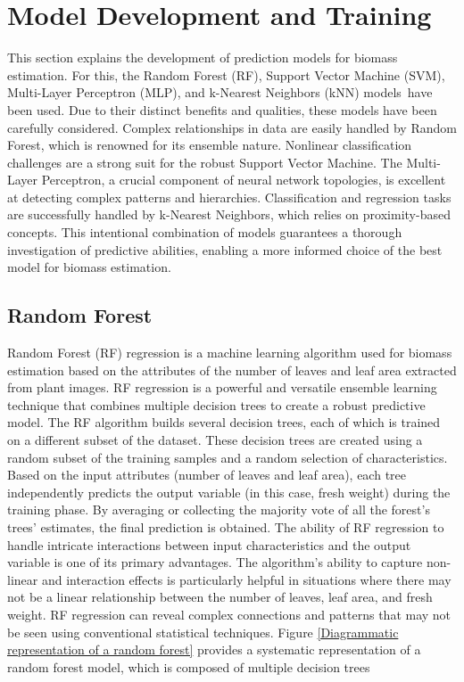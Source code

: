 \documentclass[a4paper,12pt]{report}%
\renewcommand{\\}{\vspace*{0.5\baselineskip} \newline}
\begin{document}
\section{Model Development and Training}
This section explains the development of prediction models for biomass estimation. For this, the Random Forest (RF), Support Vector Machine (SVM), Multi-Layer Perceptron (MLP), and k-Nearest Neighbors (kNN) models have been used. Due to their distinct benefits and qualities, these models have been carefully considered. Complex relationships in data are easily handled by Random Forest, which is renowned for its ensemble nature. Nonlinear classification challenges are a strong suit for the robust Support Vector Machine. The Multi-Layer Perceptron, a crucial component of neural network topologies, is excellent at detecting complex patterns and hierarchies. Classification and regression tasks are successfully handled by k-Nearest Neighbors, which relies on proximity-based concepts.
This intentional combination of models guarantees a thorough investigation of predictive abilities, enabling a more informed choice of the best model for biomass estimation.


\subsection{Random Forest}
Random Forest (RF) regression is a machine learning algorithm used for biomass estimation based on the attributes of the number of leaves and leaf area extracted from plant images. RF regression is a powerful and versatile ensemble learning technique that combines multiple decision trees to create a robust predictive model.
The RF algorithm builds several decision trees, each of which is trained on a different subset of the dataset. These decision trees are created using a random subset of the training samples and a random selection of characteristics. Based on the input attributes (number of leaves and leaf area), each tree independently predicts the output variable (in this case, fresh weight) during the training phase. By averaging or collecting the majority vote of all the forest's trees' estimates, the final prediction is obtained.
The ability of RF regression to handle intricate interactions between input characteristics and the output variable is one of its primary advantages. The algorithm's ability to capture non-linear and interaction effects is particularly helpful in situations where there may not be a linear relationship between the number of leaves, leaf area, and fresh weight. RF regression can reveal complex connections and patterns that may not be seen using conventional statistical techniques. Figure \ref{Diagrammatic representation of a random forest} provides a systematic representation of a random forest model, which is composed of multiple decision trees
\end{document}
